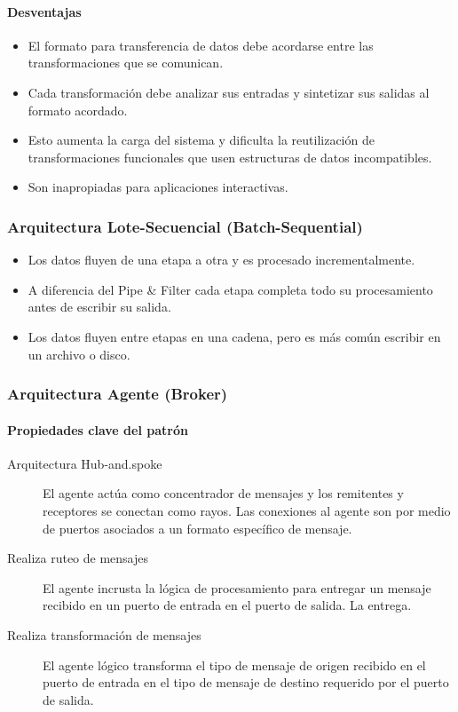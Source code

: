 \paragraph{Desventajas}
\begin{itemize}
	\item El formato para transferencia de datos debe acordarse entre las	transformaciones que se comunican.
	\item Cada transformación debe analizar sus entradas y sintetizar sus salidas al formato acordado.
	\item Esto aumenta la carga del sistema y dificulta la reutilización de transformaciones funcionales que usen estructuras de datos incompatibles.
	\item Son inapropiadas para aplicaciones interactivas.
\end{itemize}
\subsubsection{Arquitectura Lote-Secuencial (Batch-Sequential)}
\begin{itemize}
	\item Los datos fluyen de una etapa a otra y es procesado incrementalmente.
	\item A diferencia del Pipe & Filter cada etapa completa todo su procesamiento antes de escribir su salida.
	\item Los datos fluyen entre etapas en una cadena, pero es más común escribir en un archivo o disco.
\end{itemize}
\subsubsection{Arquitectura Agente (Broker)}
\paragraph{Propiedades clave del patrón}
\begin{description}
	\item [Arquitectura Hub-and.spoke] El agente actúa como concentrador de mensajes y los remitentes y receptores se conectan como rayos. Las conexiones al agente son por medio de puertos asociados a un formato específico de mensaje.
	\item[Realiza ruteo de mensajes] El agente incrusta la lógica de procesamiento para entregar un mensaje recibido en un puerto de entrada en el puerto de salida. La entrega.
	\item[Realiza transformación de mensajes] El agente lógico transforma el tipo de mensaje de origen recibido en el puerto de entrada en el tipo de mensaje de destino requerido por el puerto de salida.
\end{description}

